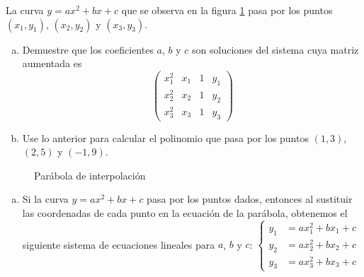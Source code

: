 \begin{prob} La curva $y=ax^2+bx+c$ que se observa en la figura \ref{parabolainterpolacion} pasa por los puntos $(x_1,y_1)$, $(x_2,y_2)$ y $(x_3,y_3)$.

\begin{multicols}{2}


\begin{enumerate}[a)]
\item Demuestre que los coeficientes $a$, $b$ y $c$ son soluciones del sistema cuya matriz aumentada es 
\[ \left( \begin{array}{ccc|c} 
x_1^2 & x_1 & 1 & y_1\\
x_2^2 & x_2 & 1 & y_2\\
x_3^2 & x_3 & 1 & y_3
\end{array} \right) \]

\item Use lo anterior para calcular el polinomio que pasa por los puntos $(1,3)$, $(2,5)$ y $(-1,9)$.
\end{enumerate}

\begin{figure}[H]
\centering
{}
\caption{Parábola de interpolación}\label{parabolainterpolacion}
\end{figure}
\end{multicols}
\begin{myproof}
\begin{enumerate}[a)]
\item Si la curva $y=ax^2+bx+c$ pasa por los puntos dados, entonces al sustituir las coordenadas de cada punto en la ecuación de la parábola, obtenemos el siguiente sistema de ecuaciones lineales para $a$, $b$ y $c$: $
\begin{cases}
y_1 &= ax_1^2 + bx_1 + c\\
y_2 &= ax_2^2 + bx_2 + c\\
y_3 &= ax_3^2 + bx_3 + c
\end{cases}$


\end{enumerate}
\end{myproof}
\end{prob}
